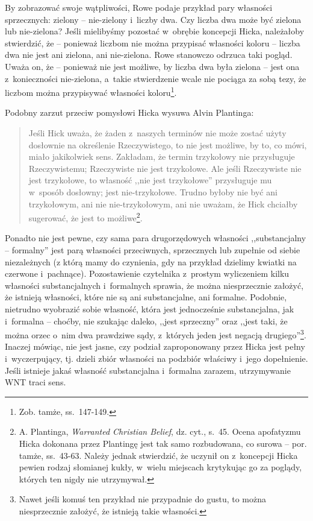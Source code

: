 By zobrazować swoje wątpliwości, Rowe podaje przykład pary własności sprzecznych: zielony -- nie-zielony i~liczby dwa. Czy liczba dwa może być zielona lub nie-zielona? Jeśli mielibyśmy pozostać w~obrębie koncepcji Hicka, należałoby stwierdzić, że -- ponieważ liczbom nie można przypisać własności koloru -- liczba dwa nie jest ani zielona, ani nie-zielona. Rowe stanowczo odrzuca taki pogląd. Uważa on, że -- ponieważ nie jest możliwe, by liczba dwa była zielona -- jest ona z~konieczności nie-zielona, a~takie stwierdzenie wcale nie pociąga za sobą tezy, że liczbom można przypisywać własności koloru\footnote{Zob. tamże, ss.~147-149.}.

Podobny zarzut przeciw pomysłowi Hicka wysuwa Alvin Plantinga:

\begin{quote}
Jeśli Hick uważa, że żaden z~naszych terminów nie może zostać użyty dosłownie na określenie Rzeczywistego, to nie jest możliwe, by to, co mówi, miało jakikolwiek sens. Zakładam, że termin trzykołowy nie przysługuje Rzeczywistemu; Rzeczywiste nie jest trzykołowe. Ale jeśli Rzeczywiste nie jest trzykołowe, to własność ,,nie jest trzykołowe'' przysługuje mu w~sposób dosłowny; jest nie-trzykołowe. Trudno byłoby nie być ani trzykołowym, ani nie nie-trzykołowym, ani nie uważam, że Hick chciałby sugerować, że jest to możliwe\footnote{A. Plantinga, \textit{Warranted Christian Belief}, dz. cyt., s.~45. Ocena apofatyzmu Hicka dokonana przez Plantingę jest tak samo rozbudowana, co surowa -- por. tamże, ss.~43-63. Należy jednak stwierdzić, że uczynił on z~koncepcji Hicka pewien rodzaj słomianej kukły, w~wielu miejscach krytykując go za poglądy, których ten nigdy nie utrzymywał.}.
\end{quote}

Ponadto nie jest pewne, czy sama para drugorzędowych własności ,,substancjalny -- formalny'' jest parą własności przeciwnych, sprzecznych lub zupełnie od siebie niezależnych (z którą mamy do czynienia, gdy na przykład dzielimy kwiatki na czerwone i~pachnące). Pozostawienie czytelnika z~prostym wyliczeniem kilku własności substancjalnych i~formalnych sprawia, że można niesprzecznie założyć, że istnieją własności, które nie są ani substancjalne, ani formalne. Podobnie, nietrudno wyobrazić sobie własność, która jest jednocześnie substancjalna, jak i~formalna -- choćby, nie szukając daleko, ,,jest sprzeczny'' oraz ,,jest taki, że można orzec o~nim dwa prawdziwe sądy, z~których jeden jest negacją drugiego''\footnote{Nawet jeśli komuś ten przykład nie przypadnie do gustu, to można niesprzecznie założyć, że istnieją takie własności.}. Inaczej mówiąc, nie jest jasne, czy podział zaproponowany przez Hicka jest pełny i~wyczerpujący, tj. dzieli zbiór własności na podzbiór właściwy i~jego dopełnienie. Jeśli istnieje jakaś własność substancjalna i~formalna zarazem, utrzymywanie WNT traci sens.

